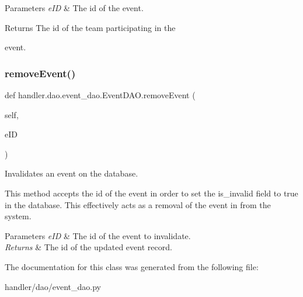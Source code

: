 \begin{DoxyParams}{Parameters}
{\em e\+ID} & The id of the event. \\
\hline
\end{DoxyParams}
\begin{DoxyReturn}{Returns}
The id of the team participating in the 

event. 
\end{DoxyReturn}
\mbox{\label{classhandler_1_1dao_1_1event__dao_1_1_event_d_a_o_a3d8c4ff8a724203eeacb90e6cb84450e}} 
\subsubsection{\texorpdfstring{remove\+Event()}{removeEvent()}}
{\footnotesize\ttfamily def handler.\+dao.\+event\+\_\+dao.\+Event\+D\+A\+O.\+remove\+Event (\begin{DoxyParamCaption}\item[{}]{self,  }\item[{}]{e\+ID }\end{DoxyParamCaption})}



Invalidates an event on the database. 

This method accepts the id of the event in order to set the is\+\_\+invalid field to true in the database. This effectively acts as a removal of the event in from the system.


\begin{DoxyParams}{Parameters}
{\em e\+ID} & The id of the event to invalidate. \\
\hline
{\em Returns} & The id of the updated event record. \\
\hline
\end{DoxyParams}


The documentation for this class was generated from the following file\+:\begin{DoxyCompactItemize}
\item 
handler/dao/event\+\_\+dao.\+py\end{DoxyCompactItemize}
